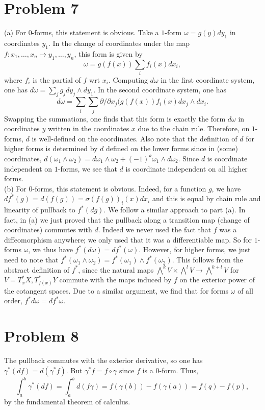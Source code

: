 \documentclass{amsart}
\numberwithin{equation}{section}
\theoremstyle{plain}
\theoremstyle{definition}
\theoremstyle{remark}
\renewcommand{\_}[2]{\underbrace{#1}_{#2}}
\renewcommand{\^}[2]{\overbrace{#1}_{#2}}
\begin{document}
\section*{Problem 7}
(a) For $0$-forms, this statement is obvious. Take a $1$-form $\omega = g(y) dy_1$ in coordinates $y_1$. In the change of coordinates under the map $f: x_1, \dots, x_n \mapsto y_1, \dots, y_n$, this form is given by \[\omega = g(f(x))\sum_i f_i(x) dx_i,\] where $f_i$ is the partial of $f$ wrt $x_i$. Computing $d\omega$ in the first coordinate system, one has $d\omega = \sum_j g_j dy_j \wedge dy_1$. In the second coordinate system, one has \[d\omega = \sum_i \sum_j \partial/\partial x_j (g(f(x)) f_i(x) dx_j\wedge dx_i.\] Swapping the summations, one finds that this form is exactly the form $d\omega$ in coordinates $y$ written in the coordinates $x$ due to the chain rule. Therefore, on $1$-forms, $d$ is well-defined on the coordinates. Also note that the definition of $d$ for higher forms is determined by $d$ defined on the lower forms since in (some) coordinates, $d(\omega_1 \wedge \omega_2) = d\omega_1 \wedge \omega_2 + (-1)^k \omega_1 \wedge d\omega_2$. Since $d$ is coordinate independent on $1$-forms, we see that $d$ is coordinate independent on all higher forms.\\

(b) For $0$-forms, this statement is obvious. Indeed, for a function $g$, we have $df^*(g)$ = $d(f(g)) = \sigma (f(g))_i(x) dx_i$ and this is equal by chain rule and linearity of pullback to $f^*(dg)$. We follow a similar approach to part (a). In fact, in (a) we just proved that the pullback along a transition map (change of coordinates) commutes with $d$. Indeed we never used the fact that $f$ was a diffeomorphism anywhere; we only used that it was a differentiable map. So for $1$-forms $\omega$, we thus have $f^*(d\omega) = df^*(\omega)$. However, for higher forms, we just need to note that $f^*(\omega_1 \wedge \omega_2) = f^*(\omega_1) \wedge f^*(\omega_2).$ This follows from the abstract definition of $f^*$, since the natural maps $\bigwedge^k V \times \bigwedge^l V \to \bigwedge^{k+l}V$ for $V = T^*_xX,T^*_{f(x)}Y$ commute with the maps induced by $f$ on the exterior power of the cotangent spaces. Due to a similar argument, we find that for forms $\omega$ of all order, $f^*d\omega = df^*\omega$.
\section*{Problem 8}
The pullback commutes with the exterior derivative, so one has $\gamma^*(df) = d(\gamma^*f)$. But $\gamma^*f = f\circ \gamma$ since $f$ is a $0$-form. Thus, \[\int_a^b \gamma^*(df) = \int_a^b d(f\gamma) = f(\gamma(b)) - f(\gamma(a)) = f(q)-f(p),\] by the fundamental theorem of calculus. 
\end{document}
